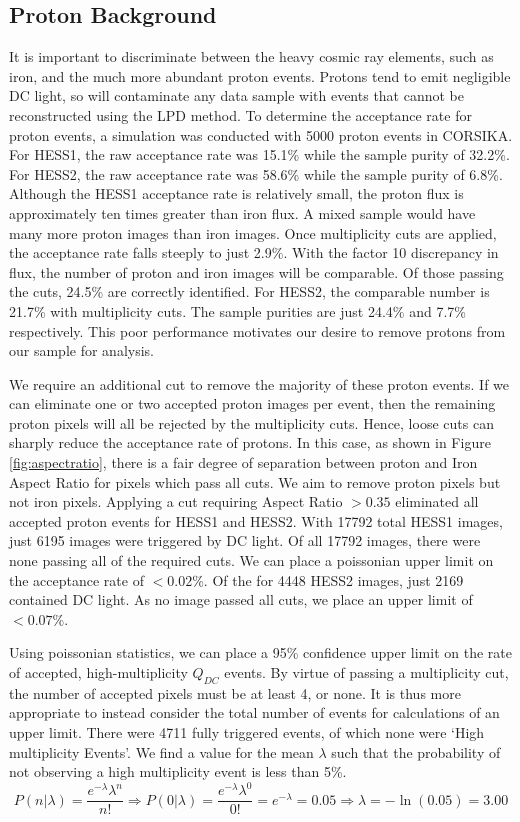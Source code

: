 \documentclass{article}
\begin{document}
\subsection{Proton Background}
It is important to discriminate between the heavy cosmic ray elements, such as iron, and the much more abundant proton events. Protons tend to emit negligible DC light, so will contaminate any data sample with events that cannot be reconstructed using the LPD method. To determine the acceptance rate for proton events, a simulation was conducted with 5000 proton events in CORSIKA. For HESS1, the raw acceptance rate was 15.1\% while the sample purity of 32.2\%. For HESS2, the raw acceptance rate was 58.6\% while the sample purity of 6.8\%. Although the HESS1 acceptance rate is relatively small, the proton flux is approximately ten times greater than iron flux. A mixed sample would have many more proton images than iron images. Once multiplicity cuts are applied, the acceptance rate falls steeply to just 2.9\%. With the factor 10 discrepancy in flux, the number of proton and iron images will be comparable. Of those passing the cuts, 24.5\% are correctly identified.  For HESS2, the comparable number is 21.7\% with multiplicity cuts. The sample purities are just 24.4\% and 7.7\% respectively. This poor performance motivates our desire to remove protons from our sample for analysis.

We require an additional cut to remove the majority of these proton events. If we can eliminate one or two accepted proton images per event, then the remaining proton pixels will all be rejected by the multiplicity cuts. Hence, loose cuts can sharply reduce the acceptance rate of protons. In this case, as shown in Figure \ref{fig:aspectratio}, there is a fair degree of separation between proton and Iron Aspect Ratio for pixels which pass all cuts. We aim to remove proton pixels but not iron pixels. Applying a cut requiring Aspect Ratio $> 0.35$ eliminated all accepted proton events for HESS1 and HESS2. With 17792 total HESS1 images, just 6195 images were triggered by DC light. Of all 17792 images, there were none passing all of the required cuts. We can place a poissonian upper limit on the acceptance rate of $< 0.02 \%$. Of the for 4448 HESS2 images, just 2169 contained DC light. As no image passed all cuts, we place an upper limit of $< 0.07\%$. 

Using poissonian statistics, we can place a 95\% confidence upper limit on the rate of accepted, high-multiplicity $Q_{DC}$ events. By virtue of passing a multiplicity cut, the number of accepted pixels must be at least 4, or none. It is thus more appropriate to instead consider the total number of events for calculations of an upper limit. There were 4711 fully triggered events, of which none were \textquoteleft High multiplicity Events'. We find a value for the mean $\lambda$ such that the probability of not observing a high multiplicity event is less than 5\%.
\[ P(n|\lambda)=\frac{e^{-\lambda}\lambda^{n}}{n!} \Longrightarrow P(0|\lambda)=\frac{e^{-\lambda}\lambda^{0}}{0!}=e^{-\lambda}=0.05
\Longrightarrow
\lambda = -\ln(0.05)=3.00\]
\end{document}
